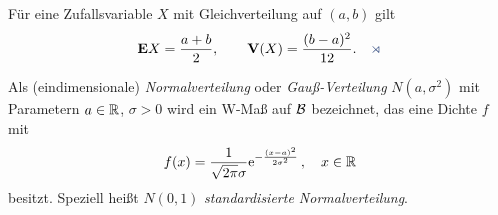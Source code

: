 \begin{prop}
\label{prop:7.4}
Für eine Zufallsvariable $X$ mit Gleichverteilung auf $(a,b)$ gilt
\begin{align*}
\E X=\frac{a+b}{2},\qquad \V(X) = \frac{(b-a)^{2}}{12}.\fishhere
\end{align*}
\end{prop} 

\begin{defn}
\label{defn:7.6}
Als (eindimensionale) \emph{Normalverteilung} oder
\emph{Gauß-Verteilung} $N(a,\sigma ^ {2})$  mit Parametern $a\in \mathbb{R}$,
$\sigma > 0$ wird ein W-Maß auf ${\mathcal{B}}$ bezeichnet, das eine Dichte $f$ mit
\begin{align*}
f(x) = \frac{1}{\sqrt{2 \pi }\sigma}\mathrm{e}^ {-\frac{(x-a)^ {2}}{2\sigma ^ {2}}}\, ,
\quad x\in \mathbb{R}
\end{align*}
besitzt. Speziell heißt $N(0,1)$ \emph{standardisierte
Normalverteilung}.\fishhere
\end{defn}

